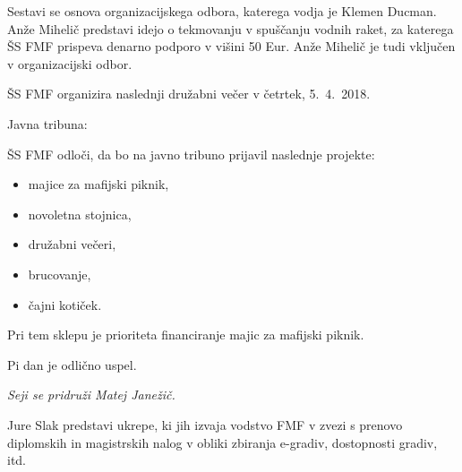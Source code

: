 \documentclass{seja}
\begin{document}
\begin{ad}
	Sestavi se osnova organizacijskega odbora, katerega vodja je Klemen Ducman. Anže Mihelič predstavi idejo o tekmovanju v spuščanju vodnih raket, za katerega ŠS FMF prispeva denarno podporo v višini 50 Eur. Anže Mihelič je tudi vključen v organizacijski odbor.
		
	\item 
	ŠS FMF organizira naslednji družabni večer v četrtek, 5.~4.~2018.
	
	\item Javna tribuna:
\begin{sklep}
ŠS FMF odloči, da bo na javno tribuno prijavil naslednje projekte:
\begin{itemize}
\item majice za mafijski piknik,
\item novoletna stojnica,
\item družabni večeri,
\item brucovanje,
\item čajni kotiček.
\end{itemize}
\end{sklep}
Pri tem sklepu je prioriteta financiranje majic za mafijski piknik.
	
	\item Pi dan je odlično uspel.
	
\textit{Seji se pridruži Matej Janežič.	}
	
	\item 
	Jure Slak predstavi ukrepe, ki jih izvaja vodstvo FMF v zvezi s prenovo diplomskih in magistrskih nalog v obliki zbiranja e-gradiv, dostopnosti gradiv, itd.
	
	
\end{ad}

\makeatletter \global\let\@enddocumenthook\@empty \makeatother
{}
\end{document}
